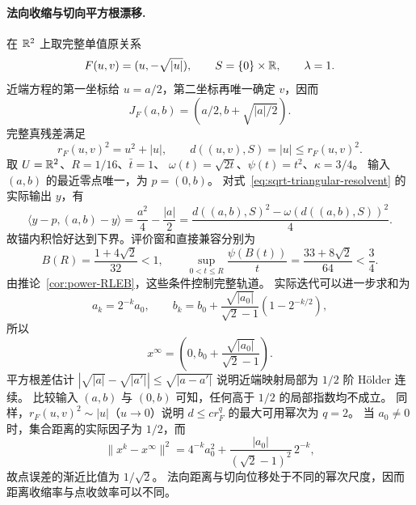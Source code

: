 \paragraph{法向收缩与切向平方根漂移.}
\label{ex:sqrt-tangential-drift}
在 $\mathbb R^2$ 上取完整单值原关系
\begin{equation}
\label{eq:sqrt-triangular-operator}
 F(u,v)=(u,-\sqrt{|u|}),\qquad
 S=\{0\}\times\mathbb R,\qquad \lambda=1.
\end{equation}
近端方程的第一坐标给 $u=a/2$，第二坐标再唯一确定 $v$，因而
\begin{equation}
\label{eq:sqrt-triangular-resolvent}
 J_F(a,b)=(a/2,b+\sqrt{|a|/2}).
\end{equation}
完整真残差满足
\[
 r_F(u,v)^2=u^2+|u|,\qquad
 d((u,v),S)=|u|\le r_F(u,v)^2.
\]
取 $U=\mathbb R^2$、$R=1/16$、$\bar t=1$、
$\omega(t)=\sqrt{2t}$、$\psi(t)=t^2$、$\kappa=3/4$。
输入 $(a,b)$ 的最近零点唯一，为 $p=(0,b)$。
对式~\eqref{eq:sqrt-triangular-resolvent} 的实际输出 $y$，有
\[
 \langle y-p,(a,b)-y\rangle
 =\frac{a^2}{4}-\frac{|a|}{2}
 =\frac{d((a,b),S)^2-\omega(d((a,b),S))^2}{4}.
\]
故锚内积恰好达到下界。评价窗和直接兼容分别为
\[
 B(R)=\frac{1+4\sqrt2}{32}<1,\qquad
 \sup_{0<t\le R}\frac{\psi(B(t))}{t}
 =\frac{33+8\sqrt2}{64}<\frac34.
\]
由推论~\ref{cor:power-RLEB}，这些条件控制完整轨道。
实际迭代可以进一步求和为
\begin{equation}
\label{eq:sqrt-triangular-orbit}
 a_k=2^{-k}a_0,\qquad
 b_k=b_0+\frac{\sqrt{|a_0|}}{\sqrt2-1}(1-2^{-k/2}),
\end{equation}
所以
\[
 x^\infty=\left(0,b_0+\frac{\sqrt{|a_0|}}{\sqrt2-1}\right).
\]
平方根差估计
$|\sqrt{|a|}-\sqrt{|a'|}|\le\sqrt{|a-a'|}$
说明近端映射局部为 $1/2$ 阶 H\"older 连续。
比较输入 $(a,b)$ 与 $(0,b)$ 可知，任何高于 $1/2$ 的局部指数均不成立。
同样，$r_F(u,v)^2\sim|u|$（$u\to0$）说明
$d\le c r_F^q$ 的最大可用幂次为 $q=2$。
当 $a_0\ne0$ 时，集合距离的实际因子为 $1/2$，而
\[
 \|x^k-x^\infty\|^2
 =4^{-k}a_0^2+
 \frac{|a_0|}{(\sqrt2-1)^2}\,2^{-k},
\]
故点误差的渐近比值为 $1/\sqrt2$。
法向距离与切向位移处于不同的幂次尺度，因而距离收缩率与点收敛率可以不同。
